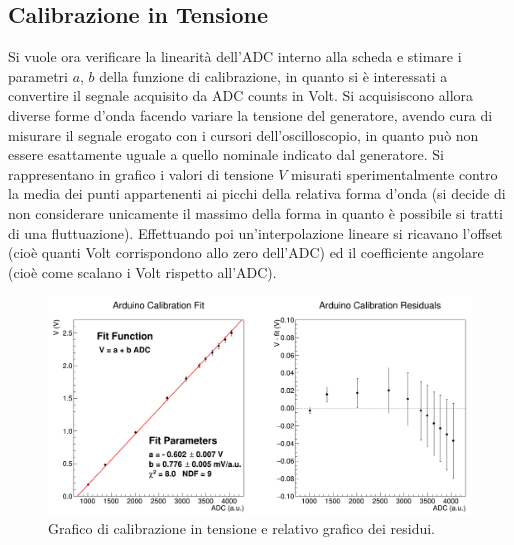 \documentclass[a4paper,11pt]{article} %
\begin{document}
\subsection{Calibrazione in Tensione}
Si vuole ora verificare la linearità dell'ADC interno alla scheda e stimare i parametri $a$, $b$ della funzione di
calibrazione, in quanto si è interessati a convertire il segnale acquisito da ADC counts in Volt. Si acquisiscono allora
diverse forme d'onda facendo variare la tensione del generatore, avendo cura di misurare il segnale erogato con i
cursori dell'oscilloscopio, in quanto può non essere esattamente uguale a quello nominale indicato dal generatore. Si
rappresentano in grafico i valori di tensione $V$ misurati sperimentalmente contro la media dei punti appartenenti ai
picchi della relativa forma d'onda (si decide di non considerare unicamente il massimo della forma in quanto è possibile
si tratti di una fluttuazione). Effettuando poi un'interpolazione lineare si ricavano l'offset (cioè
quanti Volt corrispondono allo zero dell'ADC) ed il coefficiente angolare (cioè come scalano i Volt rispetto all'ADC).

\begin{figure}[H]
	\centering
	\includegraphics[width=15cm]{../Arduino/Plots/calib_function.png}
	\caption{Grafico di calibrazione in tensione e relativo grafico dei residui.}
	\label{i:ar_calib}
\end{figure}
\end{document}
